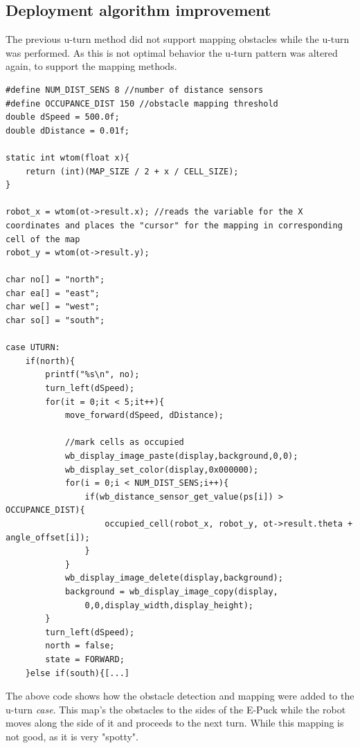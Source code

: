 \subsection{Deployment algorithm improvement}
\label{deployment_improvement}
The previous u-turn method did not support mapping obstacles while the u-turn was performed. As this is not optimal behavior the u-turn pattern was altered again, to support the mapping methods.

\begin{lstlisting}[caption={U-turn improved with obstacle detection and mapping}, label={uturn_code}]
#define NUM_DIST_SENS 8 //number of distance sensors
#define OCCUPANCE_DIST 150 //obstacle mapping threshold
double dSpeed = 500.0f;
double dDistance = 0.01f;

static int wtom(float x){
    return (int)(MAP_SIZE / 2 + x / CELL_SIZE);
}

robot_x = wtom(ot->result.x); //reads the variable for the X coordinates and places the "cursor" for the mapping in corresponding cell of the map
robot_y = wtom(ot->result.y);

char no[] = "north";
char ea[] = "east";
char we[] = "west";
char so[] = "south";

case UTURN:
    if(north){
        printf("%s\n", no);
        turn_left(dSpeed);
        for(it = 0;it < 5;it++){
            move_forward(dSpeed, dDistance);
            
            //mark cells as occupied
            wb_display_image_paste(display,background,0,0);
            wb_display_set_color(display,0x000000);
            for(i = 0;i < NUM_DIST_SENS;i++){
                if(wb_distance_sensor_get_value(ps[i]) > OCCUPANCE_DIST){
                    occupied_cell(robot_x, robot_y, ot->result.theta + angle_offset[i]);
                }
            }
            wb_display_image_delete(display,background);
            background = wb_display_image_copy(display,
                0,0,display_width,display_height);
        }
        turn_left(dSpeed);
        north = false;
        state = FORWARD;
    }else if(south){[...]
\end{lstlisting}

The above code shows how the obstacle detection and mapping were added to the u-turn \textit{case}.
This map's the obstacles to the sides of the E-Puck while the robot moves along the side of it and proceeds to the next turn. While this mapping is not good, as it is very "spotty".

